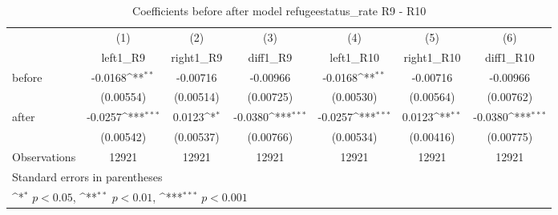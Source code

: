 \begin{table}[htbp]\centering
\def\sym#1{\ifmmode^{#1}\else\(^{#1}\)\fi}
\caption{Coefficients before after model refugeestatus\_rate R9 - R10}
\begin{tabular}{l*{6}{c}}
\hline\hline
                    &\multicolumn{1}{c}{(1)}&\multicolumn{1}{c}{(2)}&\multicolumn{1}{c}{(3)}&\multicolumn{1}{c}{(4)}&\multicolumn{1}{c}{(5)}&\multicolumn{1}{c}{(6)}\\
                    &\multicolumn{1}{c}{left1\_R9}&\multicolumn{1}{c}{right1\_R9}&\multicolumn{1}{c}{diff1\_R9}&\multicolumn{1}{c}{left1\_R10}&\multicolumn{1}{c}{right1\_R10}&\multicolumn{1}{c}{diff1\_R10}\\
\hline
before              &     -0.0168\sym{**} &    -0.00716         &    -0.00966         &     -0.0168\sym{**} &    -0.00716         &    -0.00966         \\
                    &   (0.00554)         &   (0.00514)         &   (0.00725)         &   (0.00530)         &   (0.00564)         &   (0.00762)         \\
[1em]
after               &     -0.0257\sym{***}&      0.0123\sym{*}  &     -0.0380\sym{***}&     -0.0257\sym{***}&      0.0123\sym{**} &     -0.0380\sym{***}\\
                    &   (0.00542)         &   (0.00537)         &   (0.00766)         &   (0.00534)         &   (0.00416)         &   (0.00775)         \\
\hline
Observations        &       12921         &       12921         &       12921         &       12921         &       12921         &       12921         \\
\hline\hline
\multicolumn{7}{l}{\footnotesize Standard errors in parentheses}\\
\multicolumn{7}{l}{\footnotesize \sym{*} \(p<0.05\), \sym{**} \(p<0.01\), \sym{***} \(p<0.001\)}\\
\end{tabular}
\end{table}
